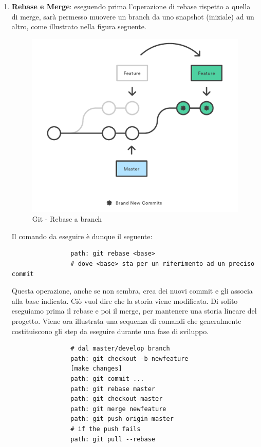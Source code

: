 \begin{enumerate}
				\item \textbf{Rebase e Merge}: eseguendo prima l'operazione di rebase rispetto a quella di merge, sarà permesso muovere un branch da uno snapshot (iniziale) ad un altro, come illustrato nella figura seguente.
					\begin{figure}[htbp]
						\centering
						\includegraphics[scale=0.6]{images/rebase.pdf}
						\caption{Git - Rebase a branch}
						\label{fig:git_rebase_a_branch}
					\end{figure}
				Il comando da eseguire è dunque il seguente:
				\begin{verbatim}
				path: git rebase <base>
				# dove <base> sta per un riferimento ad un preciso commit
				\end{verbatim}
				Questa operazione, anche se non sembra, crea dei nuovi commit e gli associa alla base indicata. Ciò vuol dire che la storia viene modificata. \newline
				Di solito eseguiamo prima il rebase e poi il merge, per mantenere una storia lineare del progetto. Viene ora illustrata una sequenza di comandi che generalmente costituiscono gli step da eseguire durante una fase di sviluppo.
				\begin{verbatim}
				# dal master/develop branch
				path: git checkout -b newfeature
				[make changes]
				path: git commit ...
				path: git rebase master
				path: git checkout master
				path: git merge newfeature
				path: git push origin master
				# if the push fails
				path: git pull --rebase
				\end{verbatim}


\end{enumerate}
